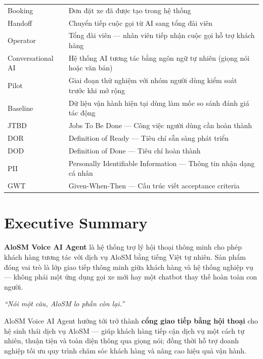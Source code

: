 \documentclass[12pt,a4paper]{article}
\begin{document}
\begin{longtable}{L{2.8cm} L{11cm}}
  Booking & Đơn đặt xe đã được tạo trong hệ thống \\
  Handoff & Chuyển tiếp cuộc gọi từ AI sang tổng đài viên \\
  Operator & Tổng đài viên --- nhân viên tiếp nhận cuộc gọi hỗ trợ khách hàng \\
  Conversational AI & Hệ thống AI tương tác bằng ngôn ngữ tự nhiên (giọng nói hoặc văn bản) \\
  Pilot & Giai đoạn thử nghiệm với nhóm người dùng kiểm soát trước khi mở rộng \\
  Baseline & Dữ liệu vận hành hiện tại dùng làm mốc so sánh đánh giá tác động \\
  JTBD & Jobs To Be Done --- Công việc người dùng cần hoàn thành \\
  DOR & Definition of Ready --- Tiêu chí sẵn sàng phát triển \\
  DOD & Definition of Done --- Tiêu chí hoàn thành \\
  PII & Personally Identifiable Information --- Thông tin nhận dạng cá nhân \\
  GWT & Given-When-Then --- Cấu trúc viết acceptance criteria \\
\end{longtable}

\newpage
\tableofcontents
\newpage

\section{Executive Summary}

\textbf{AloSM Voice AI Agent} là hệ thống trợ lý hội thoại thông minh cho phép khách hàng tương tác với dịch vụ AloSM bằng tiếng Việt tự nhiên. Sản phẩm đóng vai trò là lớp giao tiếp thông minh giữa khách hàng và hệ thống nghiệp vụ --- không phải một ứng dụng gọi xe mới hay một chatbot thay thế hoàn toàn con người.

\begin{tcolorbox}[visionbox,title={Tầm nhìn sản phẩm}]
  \begin{center}
    {\large\itshape ``Nói một câu, AloSM lo phần còn lại.''}
  \end{center}
  \vspace{0.3em}
  AloSM Voice AI Agent hướng tới trở thành \textbf{cổng giao tiếp bằng hội thoại} cho hệ sinh thái dịch vụ AloSM --- giúp khách hàng tiếp cận dịch vụ một cách tự nhiên, thuận tiện và toàn diện thông qua giọng nói; đồng thời hỗ trợ doanh nghiệp tối ưu quy trình chăm sóc khách hàng và nâng cao hiệu quả vận hành.
\end{tcolorbox}
\end{document}
